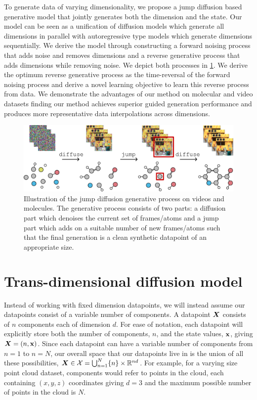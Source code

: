 To generate data of varying dimensionality, we propose a jump diffusion based generative model that jointly generates both the dimension and the state. Our model can be seen as a unification of diffusion models which generate all dimensions in parallel with autoregressive type models which generate dimensions sequentially. We derive the model through constructing a forward noising process that adds noise and removes dimensions and a reverse generative process that adds dimensions while removing noise. We depict both processes in \cref{fig:tddm-fig1}. We derive the optimum reverse generative process as the time-reversal of the forward noising process and derive a novel learning objective to learn this reverse process from data. We demonstrate the advantages of our method on molecular and video datasets finding our method achieves superior guided generation performance and produces more representative data interpolations across dimensions.

\begin{figure}
    \centering
    \includegraphics[width=\textwidth]{figs/tddm/fig1.pdf}
    \caption{Illustration of the jump diffusion generative process on videos and molecules. The generative process consists of two parts: a diffusion part which denoises the current set of frames/atoms and a jump part which adds on a suitable number of new frames/atoms such that the final generation is a clean synthetic datapoint of an appropriate size.
    }
    \label{fig:tddm-fig1}
\end{figure}


\section{Trans-dimensional diffusion model}
Instead of working with fixed dimension datapoints, we will instead assume our datapoints consist of a variable number of components. A datapoint ${\bm{X}}$ consists of $n$ components each of dimension $d$. For ease of notation, each datapoint will explicitly store both the number of components, $n$, and the state values, ${\mathbf{x}}$, giving ${\bm{X}} = (n, {\mathbf{x}})$. Since each datapoint can have a variable number of components from $n=1$ to $n=N$, our overall space that our datapoints live in is the union of all these possibilities, ${\bm{X}} \in {\mathcal{X}} = \bigcup_{n=1}^N \{n \} \times \mathbb{R}^{nd}$. For example, for a varying size point cloud dataset, components would refer to points in the cloud, each containing $(x,y,z)$ coordinates giving $d=3$ and the maximum possible number of points in the cloud is $N$.

